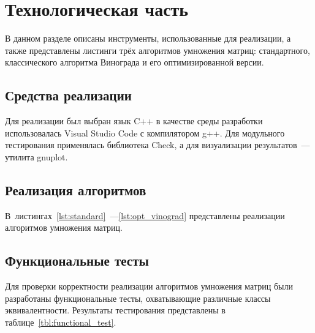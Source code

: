 \chapter{Технологическая часть}

В данном разделе описаны инструменты, использованные для реализации, а также представлены листинги трёх алгоритмов умножения матриц: стандартного, классического алгоритма Винограда и его оптимизированной версии.

\section{Средства реализации}
Для реализации был выбран язык C++ в качестве среды разработки использовалась Visual Studio Code с компилятором g++. Для модульного тестирования применялась библиотека Check, а для визуализации результатов~--- утилита gnuplot.

\section{Реализация алгоритмов}

В~листингах~\ref{lst:standard}~---\ref{lst:opt_vinograd} представлены реализации алгоритмов умножения матриц.

\section{Функциональные тесты}

Для проверки корректности реализации алгоритмов умножения матриц были разработаны функциональные тесты, охватывающие различные классы эквивалентности. Результаты тестирования представлены в таблице~\ref{tbl:functional_test}.

